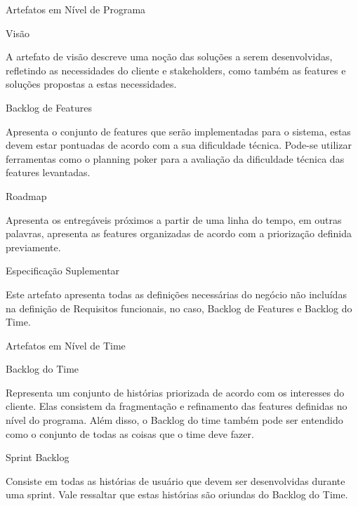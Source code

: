 {\large{Artefatos em Nível de Programa \\}}

{
	\large{Visão \\}

	\tab A artefato de visão descreve uma noção das soluções a serem desenvolvidas, refletindo as necessidades do cliente e stakeholders, como também as features e soluções propostas a estas necessidades. \\
}


{
	\large{Backlog de Features \\}

	\tab Apresenta o conjunto de features que serão implementadas para o sistema, estas devem estar pontuadas de acordo com a sua dificuldade técnica. Pode-se utilizar ferramentas como o planning poker para a avaliação da dificuldade técnica das features levantadas. \\
}

{
	\large{Roadmap \\}

	\tab Apresenta os entregáveis próximos a partir de uma linha do tempo, em outras palavras, apresenta as features organizadas de acordo com a priorização definida previamente. \\
}

{
	\large{Especificação Suplementar\\}

	\tab Este artefato apresenta todas as definições necessárias do negócio não incluídas na definição de Requisitos funcionais, no caso, Backlog de Features e Backlog do Time. \\
}

{\large{Artefatos em Nível de Time \\}}

{
	\large{Backlog do Time \\}

	\tab Representa um conjunto de histórias priorizada de acordo com os interesses do cliente. Elas consistem da fragmentação e refinamento das features definidas no nível do programa. Além disso, o Backlog do time também pode ser entendido como o conjunto de todas as coisas que o time deve fazer. \\
}

{
	\large{Sprint Backlog\\}

	\tab Consiste em todas as histórias de usuário que devem ser desenvolvidas durante uma sprint. Vale ressaltar que estas histórias são oriundas do Backlog do Time. \\
}

